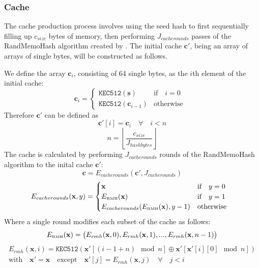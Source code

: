 \documentclass[9pt,oneside]{amsart}
\begin{document}
\subsubsection{Cache}
The cache production process involves using the seed hash to first sequentially filling up $c_{size}$ bytes of memory, then performing $J_{cacherounds}$ passes of the RandMemoHash algorithm created by \cite{lerner2014randmemohash}. The initial cache $\mathbf{c'}$, being an array of arrays of single bytes, will be constructed as follows.

We define the array $\mathbf{c}_{i}$, consisting of 64 single bytes,  as the $i$th element of the initial cache:
\begin{equation}
 \mathbf{c}_{i} = \begin{cases}
\texttt{KEC512}(\mathbf{s}) & \text{if} \quad i = 0 \quad  \\
\texttt{KEC512}(\mathbf{c}_{i-1}) & \text{otherwise}
\end{cases}
\end{equation}
Therefore $ \mathbf{c'}$ can be defined as
\begin{equation}
 \mathbf{c'}[i] = \mathbf{c}_{i} \quad \forall \quad i < n
\end{equation}
\begin{equation}
 n = \left\lfloor\frac{c_{size}}{J_{hashbytes}}\right\rfloor
\end{equation}
The cache is calculated by performing $J_{cacherounds}$ rounds of the RandMemoHash algorithm to the inital cache $\mathbf{c'}$:
\begin{equation}
 \mathbf{c} = E_{cacherounds}(\mathbf{c'}, J_{cacherounds})
\end{equation}
\begin{equation}
 E_{cacherounds}(\mathbf{x}, y) = \begin{cases}
\mathbf{x} & \text{if} \quad y = 0 \quad  \\
E_\text{\tiny RMH}(\mathbf{x}) & \text{if} \quad y = 1 \quad  \\
E_{cacherounds}(E_\text{\tiny RMH}(\mathbf{x}), y -1 ) & \text{otherwise}
\end{cases}
\end{equation}
Where a single round modifies each subset of the cache as follows:
\begin{equation}
 E_\text{\tiny RMH}(\mathbf{x}) = \big( E_{rmh}(\mathbf{x}, 0), E_{rmh}(\mathbf{x}, 1), ... , E_{rmh}(\mathbf{x}, n - 1) \big)
\end{equation}
\begin{multline}
  E_{rmh}(\mathbf{x}, i) = \texttt{KEC512}(\mathbf{x'}[(i - 1 + n) \mod n] \oplus \mathbf{x'}[\mathbf{x'}[i][0] \mod n]) \\
  \text{with} \quad \mathbf{x'} = \mathbf{x} \quad \text{except} \quad \mathbf{x'}[j] = E_{rmh}(\mathbf{x}, j) \quad \forall \quad j < i
\end{multline}
\end{document}
